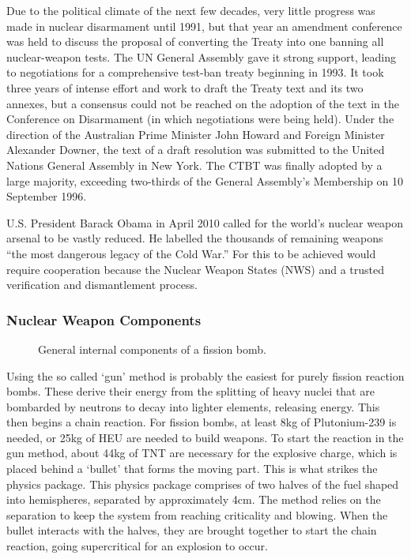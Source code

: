 \documentclass[twoside,titlepage,11pt,twocolumn,a4paper]{article}
\begin{document}
Due to the political climate of the next few decades, very little
progress was made in nuclear disarmament until 1991, but that year an
amendment conference was held to discuss the proposal of converting
the Treaty into one banning all nuclear-weapon tests. The UN General
Assembly gave it strong support, leading to negotiations for a
comprehensive test-ban treaty beginning in 1993. It took three years
of intense effort and work to draft the Treaty text and its two
annexes, but a consensus could not be reached on the adoption of the
text in the Conference on Disarmament (in which negotiations were
being held). Under the direction of the Australian Prime Minister John
Howard and Foreign Minister Alexander Downer, the text of a draft
resolution was submitted to the United Nations General Assembly in New
York. The CTBT was finally adopted by a large majority, exceeding
two-thirds of the General Assembly's Membership on 10 September 1996.

U.S. President Barack Obama in April 2010 called for the world's
nuclear weapon arsenal to be vastly reduced. He labelled the thousands
of remaining weapons ``the most dangerous legacy of the Cold War.''
For this to be achieved would require cooperation because the Nuclear
Weapon States (NWS) and a trusted verification and dismantlement
process.

\subsubsection{Nuclear Weapon Components}
\begin{figure}
   
  \caption{General internal components of a fission
    bomb. \citep{fissionBomb}}
\end{figure}

Using the so called `gun' method is probably the easiest for purely
fission reaction bombs. These derive their energy from the splitting
of heavy nuclei that are bombarded by neutrons to decay into lighter
elements, releasing energy. This then begins a chain reaction. For
fission bombs, at least 8kg of Plutonium-239 is needed, or 25kg of HEU
are needed to build weapons. \citep{cochran1995} To start the reaction
in the gun method, about 44kg of TNT are necessary
\citep{howToMakeBomb} for the explosive charge, which is placed behind
a `bullet' that forms the moving part. This is what strikes the
physics package. This physics package comprises of two halves of the
fuel shaped into hemispheres, separated by approximately 4cm. The
method relies on the separation to keep the system from reaching
criticality and blowing. When the bullet interacts with the halves,
they are brought together to start the chain reaction, going
supercritical for an explosion to occur.
\end{document}
